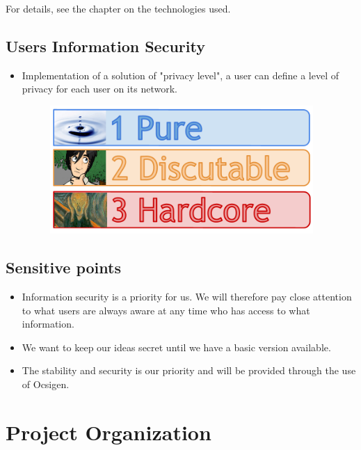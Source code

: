 \documentclass {life-en}
\begin{document}
For details, see the chapter on the technologies used.

\section{Users Information Security}

\begin{itemize}
  \item Implementation of a solution of "privacy level", a user can define a level of privacy for each user on its network. 

\begin{figure} [H]
  \begin{center}
    \includegraphics [width = 10cm]{img/confidentialite.png}
  \end{center}
\end{figure}

\end{itemize}

\section{Sensitive points}

\begin{itemize}
  \item Information security is a priority for us. We will therefore pay close attention to what users are always aware at any time who has access to what information.
  \item We want to keep our ideas secret until we have a basic version available.
  \item The stability and security is our priority and will be provided through the use of Ocsigen.
\end{itemize}


\chapter{Project Organization}
\end{document}

